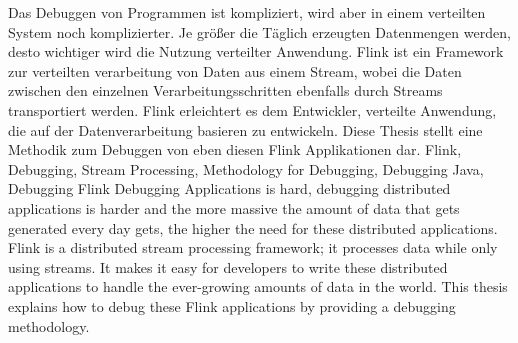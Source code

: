\documentclass[draft=false
              ,paper=a4
              ,twoside=false
              ,fontsize=11pt
              ,headsepline
              ,BCOR10mm
              ,DIV11
              ]{scrbook}
\begin{document}

\frontmatter

\maketitle

\onehalfspacing

\HAWAbstractPage
{Das Debuggen von Programmen ist kompliziert, wird aber in einem verteilten System noch komplizierter. Je größer die Täglich erzeugten Datenmengen werden, desto wichtiger wird die Nutzung verteilter Anwendung. Flink ist ein Framework zur verteilten verarbeitung von Daten aus einem Stream, wobei die Daten zwischen den einzelnen Verarbeitungsschritten ebenfalls durch Streams transportiert werden. Flink erleichtert es dem Entwickler, verteilte Anwendung, die auf der Datenverarbeitung basieren zu entwickeln. Diese Thesis stellt eine Methodik zum Debuggen von eben diesen Flink Applikationen dar.}
{Flink, Debugging, Stream Processing, Methodology for Debugging, Debugging Java, Debugging Flink}%
{Debugging Applications is hard, debugging distributed applications is harder and the more massive the amount of data that gets generated every day gets, the higher the need for these distributed applications. Flink is a distributed stream processing framework; it processes data while only using streams. It makes it easy for developers to write these distributed applications to handle the ever-growing amounts of data in the world. This thesis explains how to debug these Flink applications by providing a debugging methodology.}

\newpage
\singlespacing

\tableofcontents
\newpage
\lstlistoflistings
\listoffigures
\end{document}
